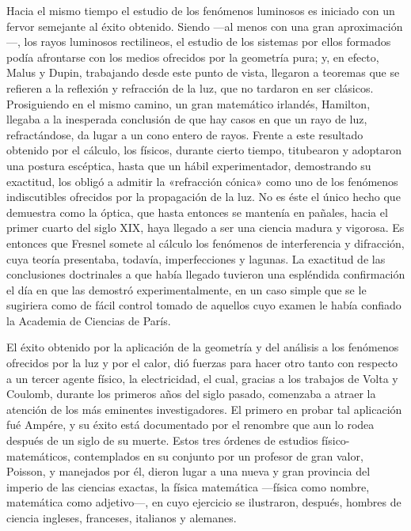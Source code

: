 \documentclass[a4paper, 12pt, draft]{article}
\begin{document}
{{Hacia el mismo tiempo el estudio de los fenómenos luminosos es iniciado con un fervor semejante al éxito obtenido. Siendo ---al menos con una gran aproximación---, los rayos luminosos rectilineos, el estudio de los sistemas por ellos formados podía afrontarse con los medios ofrecidos por la geometría pura; y, en efecto, Malus y Dupin, trabajando desde este punto de vista, llegaron a teoremas que se refieren a la reflexión y refracción de la luz, que no tardaron en ser clásicos. Prosiguiendo en el mismo camino, un gran matemático irlandés, Hamilton, llegaba a la inesperada conclusión de que hay casos en que un rayo de luz, refractándose, da lugar a un cono entero de rayos. Frente a este resultado obtenido por el cálculo, los físicos, durante cierto tiempo, titubearon y adoptaron una postura escéptica, hasta que un hábil experimentador, demostrando su exactitud, los obligó a admitir la «refracción cónica» como uno de los fenómenos indiscutibles ofrecidos por la propagación de la luz. No es éste el único hecho que demuestra como la óptica, que hasta entonces se mantenía en pañales, hacia el primer cuarto del siglo XIX, haya llegado a ser una ciencia madura y vigorosa. Es entonces que Fresnel somete al cálculo los fenómenos de interferencia y difracción, cuya teoría presentaba, todavía, imperfecciones y lagunas. La exactitud de las conclusiones doctrinales a que había llegado tuvieron una espléndida confirmación el día en que las demostró experimentalmente, en un caso simple que se le sugiriera como de fácil control tomado de aquellos cuyo examen le había confiado la Academia de Ciencias de París.

El éxito obtenido por la aplicación de la geometría y del análisis a los fenómenos ofrecidos por la luz y por el calor, dió fuerzas para hacer otro tanto con respecto a un tercer agente físico, la electricidad, el cual, gracias a los trabajos de Volta y Coulomb, durante los primeros años del siglo pasado, comenzaba a atraer la atención de los más eminentes investigadores. El primero en probar tal aplicación fué Ampére, y su éxito está documentado por el renombre que aun lo rodea después de un siglo de su muerte.
Estos tres órdenes de estudios físico-matemáticos, contemplados en su conjunto por un profesor de gran valor, Poisson, y manejados por él, dieron lugar a una nueva y gran provincia del imperio de las ciencias exactas, la física matemática ---física como nombre, matemática como adjetivo---, en cuyo ejercicio se ilustraron, después, hombres de ciencia ingleses, franceses, italianos y alemanes.

}}
\end{document}
